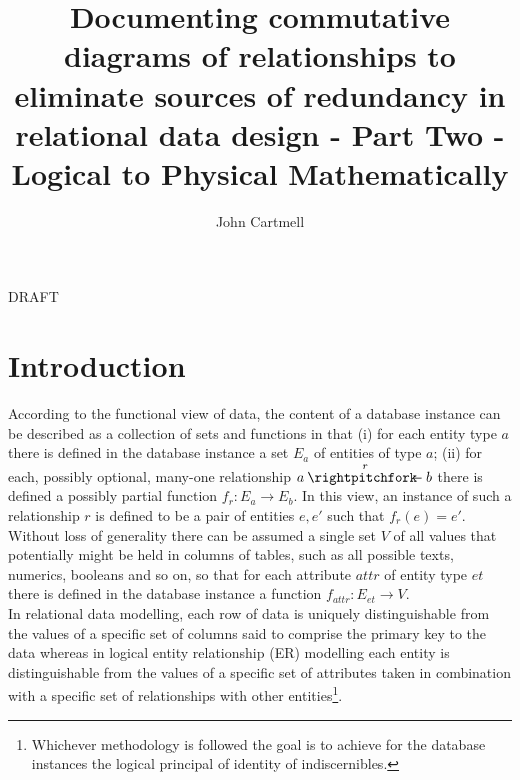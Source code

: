 \documentclass[10pt,a4paper]{article}
\begin{document}
\title{Documenting commutative diagrams of relationships to eliminate sources of redundancy in relational data design - Part Two - Logical to Physical Mathematically}

\author{John Cartmell}

\maketitle
\begin{center}
DRAFT
\end{center}

% 

\section{Introduction}

\noindent According to the functional view of data, the content of a 
database instance can be described as a collection of sets 
and functions in that (i) for each entity type $a$ there is defined in 
the database instance a set $E_a$ of entities of type $a$;
(ii) for each, possibly optional, 
many-one relationship $a \overset{r}{\rightpitchfork \hspace{-0.35em} -}b$
there is defined a possibly partial function $f_r : E_a \rightarrow E_b$. 
In this view, an instance of such a relationship $r$ is defined to be a pair 
of entities $e,e'$ such that $f_r(e)=e'$. Without loss of generality
there can be assumed a single set $V$ of all values 
that potentially might be held in columns of tables, 
such as all possible texts, numerics, booleans and so on,
so that for each attribute $attr$
of entity type $et$ there is defined in the database instance a function
$f_{attr}: E_{et} \rightarrow V$. \\

\noindent 
In relational data modelling, each row of data is uniquely distinguishable from the values of a specific set of columns said to 
comprise the primary key to the data whereas in logical entity relationship (ER) modelling each entity is distinguishable from the values of a specific set of attributes taken in combination with a specific set of relationships with other entities\footnote{Whichever methodology is followed the goal is to achieve for the database instances the logical principal of identity of indiscernibles.}. \\
\end{document}
